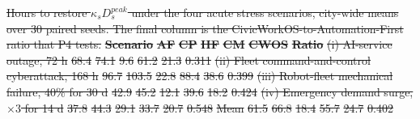 \documentclass[utf8]{FrontiersinHarvard}
\providecommand{\DIFdel}[1]{{\protect\color{red}\sout{#1}}}                      %
\providecommand{\DIFdelFL}[1]{\DIFdel{#1}} %
\begin{document}
{%
\DIFdelFL{Hours to restore $\kappa_s D^{peak}_s$ under the four acute stress scenarios, city-wide means over 30 paired seeds. The final column is the CivicWorkOS-to-Automation-First ratio that P4 tests.}}
\textbf{\DIFdelFL{Scenario}} %
\textbf{\DIFdelFL{AF}} %
\textbf{\DIFdelFL{CP}} %
\textbf{\DIFdelFL{HF}} %
\textbf{\DIFdelFL{CM}} %
\textbf{\DIFdelFL{CWOS}} %
\textbf{\DIFdelFL{Ratio}}%
\DIFdelFL{(i) AI-service outage, 72 h }%
\DIFdelFL{68.4 }%
\DIFdelFL{74.1 }%
\DIFdelFL{9.6 }%
\DIFdelFL{61.2 }%
\DIFdelFL{21.3 }%
\DIFdelFL{0.311}%
\DIFdelFL{(ii) Fleet command-and-control cyberattack, 168 h }%
\DIFdelFL{96.7 }%
\DIFdelFL{103.5 }%
\DIFdelFL{22.8 }%
\DIFdelFL{88.4 }%
\DIFdelFL{38.6 }%
\DIFdelFL{0.399}%
\DIFdelFL{(iii) Robot-fleet mechanical failure, 40\% for 30 d }%
\DIFdelFL{42.9 }%
\DIFdelFL{45.2 }%
\DIFdelFL{12.1 }%
\DIFdelFL{39.6 }%
\DIFdelFL{18.2 }%
\DIFdelFL{0.424}%
\DIFdelFL{(iv) Emergency demand surge, $\times 3$ for 14 d }%
\DIFdelFL{37.8 }%
\DIFdelFL{44.3 }%
\DIFdelFL{29.1 }%
\DIFdelFL{33.7 }%
\DIFdelFL{20.7 }%
\DIFdelFL{0.548}%
\DIFdelFL{Mean }%
\DIFdelFL{61.5 }%
\DIFdelFL{66.8 }%
\DIFdelFL{18.4 }%
\DIFdelFL{55.7 }%
\DIFdelFL{24.7 }%
\DIFdelFL{0.402}%
\end{document}
